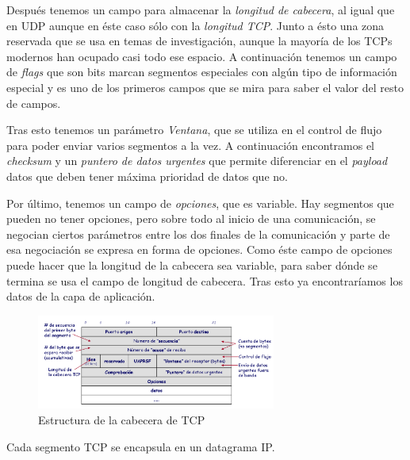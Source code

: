 \documentclass[10pt,a4paper,spanish]{report}
\begin{document}
Después tenemos un campo para almacenar la \textit{\textcolor{tema3}{longitud de cabecera}}, al igual que en UDP aunque en éste caso sólo con la \textit{\textcolor{tema3}{longitud TCP}}. Junto a ésto una zona reservada que se usa en temas de investigación, aunque la mayoría de los TCPs modernos han ocupado casi todo ese espacio. A continuación tenemos un campo de \textit{\textcolor{tema3}{flags}} que son bits marcan segmentos especiales con algún tipo de información especial y es uno de los primeros campos que se mira para saber el valor del resto de campos.

Tras esto tenemos un parámetro \textit{\textcolor{tema3}{Ventana}}, que se utiliza en el control de flujo para poder enviar varios segmentos a la vez. A continuación encontramos el \textit{\textcolor{tema3}{checksum}} y un \textit{\textcolor{tema3}{puntero de datos urgentes}} que permite diferenciar en el \textit{\textcolor{tema3}{payload}} datos que deben tener máxima prioridad de datos que no.

Por último, tenemos un campo de \textit{\textcolor{tema3}{opciones}}, que es variable. Hay segmentos que pueden no tener opciones, pero sobre todo al inicio de una comunicación, se negocian ciertos parámetros entre los dos finales de la comunicación y parte de esa negociación se expresa en forma de opciones. Como éste campo de opciones puede hacer que la longitud de la cabecera sea variable, para saber dónde se termina se usa el campo de longitud de cabecera. Tras esto ya encontraríamos los datos de la capa de aplicación.

\begin{figure}[!h]
  \centering
  \includegraphics[width=0.7\textwidth]{cabeceraTCP}
  \caption{Estructura de la cabecera de TCP}
  \label{cabeceratcp}
\end{figure}

Cada segmento TCP se encapsula en un datagrama IP.

\end{document}
